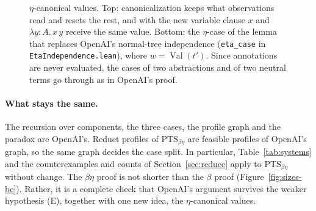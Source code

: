 \documentclass[10pt]{article}
\newcommand{\canon}{\operatorname{can}}
\newcommand{\App}{\operatorname{App}}
\newcommand{\Lam}{\operatorname{Lam}}
\newcommand{\Val}{\operatorname{Val}}
\begin{document}
\begin{figure}[H]
\caption{$\eta$-canonical values. Top: canonicalization keeps what observations read
and resets the rest, and with the new variable clause $x$ and $\lambda y{:}A.\,x\,y$
receive the same value. Bottom: the $\eta$-case of the lemma that replaces OpenAI's
normal-tree independence (\texttt{eta\_case} in \texttt{EtaIndependence.lean}), where
$w=\Val(t')$. Since annotations are never evaluated, the cases of two abstractions
and of two neutral terms go through as in OpenAI's proof.}
\label{fig:canon}
\end{figure}

\paragraph{What stays the same.} The recursion over components, the three cases, the
profile graph and the paradox are OpenAI's. Reduct profiles of
$\mathrm{PTS}_{\beta\eta}$ are feasible profiles of OpenAI's graph, so the same graph
decides the case split. In particular, Table~\ref{tab:systems} and the
counterexamples and counts of Section~\ref{sec:reduce} apply to
$\mathrm{PTS}_{\beta\eta}$ without change. The $\beta\eta$ proof is not shorter than
the $\beta$ proof (Figure~\ref{fig:sizes-be}). Rather, it is a complete check that
OpenAI's argument survives the weaker hypothesis (E), together with one new idea,
the $\eta$-canonical values.
\end{document}
